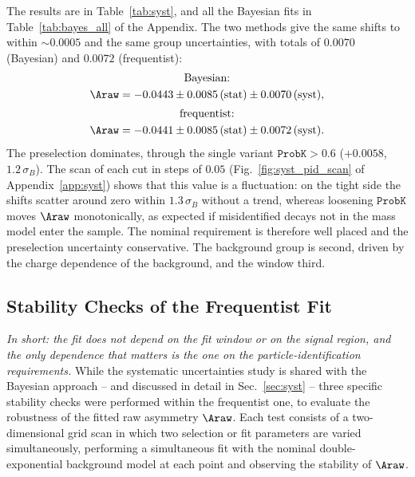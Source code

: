 The results are in Table~\ref{tab:syst}, and all the Bayesian fits in Table~\ref{tab:bayes_all} of the Appendix. The two methods give the same shifts to within $\sim$$0.0005$ and the same group uncertainties, with totals of $0.0070$ (Bayesian) and $0.0072$ (frequentist):
\begin{gather*}
\text{Bayesian:}\\ \Araw=-0.0443\pm0.0085\,(\text{stat})\pm0.0070\,(\text{syst}),\\[2pt]
\text{frequentist:}\\ \Araw=-0.0441\pm0.0085\,(\text{stat})\pm0.0072\,(\text{syst}).
\end{gather*}
The preselection dominates, through the single variant $\texttt{ProbK}>0.6$ ($+0.0058$, $1.2\,\sigma_B$). The scan of each cut in steps of $0.05$ (Fig.~\ref{fig:syst_pid_scan} of Appendix~\ref{app:syst}) shows that this value is a fluctuation: on the tight side the shifts scatter around zero within $1.3\,\sigma_B$ without a trend, whereas loosening $\texttt{ProbK}$ moves $\Araw$ monotonically, as expected if misidentified decays not in the mass model enter the sample. The nominal requirement is therefore well placed and the preselection uncertainty conservative. The background group is second, driven by the charge dependence of the background, and the window third.

\subsection{Stability Checks of the Frequentist Fit}
\label{sec:freq_syst}
\label{sec:syst_scans}
\emph{In short: the fit does not depend on the fit window or on the signal region, and the only dependence that matters is the one on the particle-identification requirements.}
While the systematic uncertainties study is shared with the Bayesian approach -- and discussed in detail in Sec.~\ref{sec:syst} -- three specific stability checks were performed within the frequentist one, to evaluate the robustness of the fitted raw asymmetry $\Araw$. Each test consists of a two-dimensional grid scan in which two selection or fit parameters are varied simultaneously, performing a simultaneous fit with the nominal double-exponential background model at each point and observing the stability of $\Araw$.

